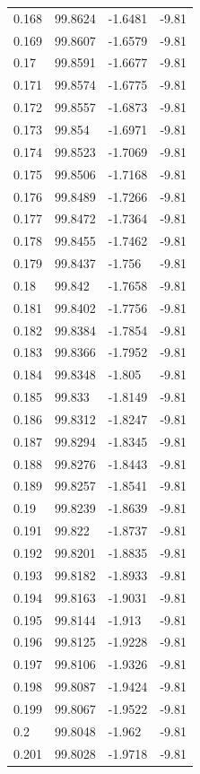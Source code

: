 \begin{tabular}{llll}
0.168 & 99.8624 & -1.6481 & -9.81 \\
0.169 & 99.8607 & -1.6579 & -9.81 \\
0.17 & 99.8591 & -1.6677 & -9.81 \\
0.171 & 99.8574 & -1.6775 & -9.81 \\
0.172 & 99.8557 & -1.6873 & -9.81 \\
0.173 & 99.854 & -1.6971 & -9.81 \\
0.174 & 99.8523 & -1.7069 & -9.81 \\
0.175 & 99.8506 & -1.7168 & -9.81 \\
0.176 & 99.8489 & -1.7266 & -9.81 \\
0.177 & 99.8472 & -1.7364 & -9.81 \\
0.178 & 99.8455 & -1.7462 & -9.81 \\
0.179 & 99.8437 & -1.756 & -9.81 \\
0.18 & 99.842 & -1.7658 & -9.81 \\
0.181 & 99.8402 & -1.7756 & -9.81 \\
0.182 & 99.8384 & -1.7854 & -9.81 \\
0.183 & 99.8366 & -1.7952 & -9.81 \\
0.184 & 99.8348 & -1.805 & -9.81 \\
0.185 & 99.833 & -1.8149 & -9.81 \\
0.186 & 99.8312 & -1.8247 & -9.81 \\
0.187 & 99.8294 & -1.8345 & -9.81 \\
0.188 & 99.8276 & -1.8443 & -9.81 \\
0.189 & 99.8257 & -1.8541 & -9.81 \\
0.19 & 99.8239 & -1.8639 & -9.81 \\
0.191 & 99.822 & -1.8737 & -9.81 \\
0.192 & 99.8201 & -1.8835 & -9.81 \\
0.193 & 99.8182 & -1.8933 & -9.81 \\
0.194 & 99.8163 & -1.9031 & -9.81 \\
0.195 & 99.8144 & -1.913 & -9.81 \\
0.196 & 99.8125 & -1.9228 & -9.81 \\
0.197 & 99.8106 & -1.9326 & -9.81 \\
0.198 & 99.8087 & -1.9424 & -9.81 \\
0.199 & 99.8067 & -1.9522 & -9.81 \\
0.2 & 99.8048 & -1.962 & -9.81 \\
0.201 & 99.8028 & -1.9718 & -9.81 \\

\end{tabular}
